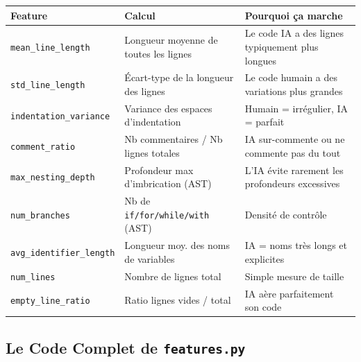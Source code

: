 \documentclass[a4paper,11pt]{article}
\begin{document}
\begin{center}
\begin{tabular}{|p{4cm}|p{5cm}|p{5cm}|}
\hline
\textbf{Feature} & \textbf{Calcul} & \textbf{Pourquoi ça marche} \\
\hline
\texttt{mean\_line\_length} & Longueur moyenne de toutes les lignes & Le code IA a des lignes typiquement plus longues \\
\hline
\texttt{std\_line\_length} & Écart-type de la longueur des lignes & Le code humain a des variations plus grandes \\
\hline
\texttt{indentation\_variance} & Variance des espaces d'indentation & Humain = irrégulier, IA = parfait \\
\hline
\texttt{comment\_ratio} & Nb commentaires / Nb lignes totales & IA sur-commente ou ne commente pas du tout \\
\hline
\texttt{max\_nesting\_depth} & Profondeur max d'imbrication (AST) & L'IA évite rarement les profondeurs excessives \\
\hline
\texttt{num\_branches} & Nb de \texttt{if/for/while/with} (AST) & Densité de contrôle \\
\hline
\texttt{avg\_identifier\_length} & Longueur moy. des noms de variables & IA = noms très longs et explicites \\
\hline
\texttt{num\_lines} & Nombre de lignes total & Simple mesure de taille \\
\hline
\texttt{empty\_line\_ratio} & Ratio lignes vides / total & IA aère parfaitement son code \\
\hline
\end{tabular}
\end{center}

\subsection{Le Code Complet de \texttt{features.py}}
\end{document}
